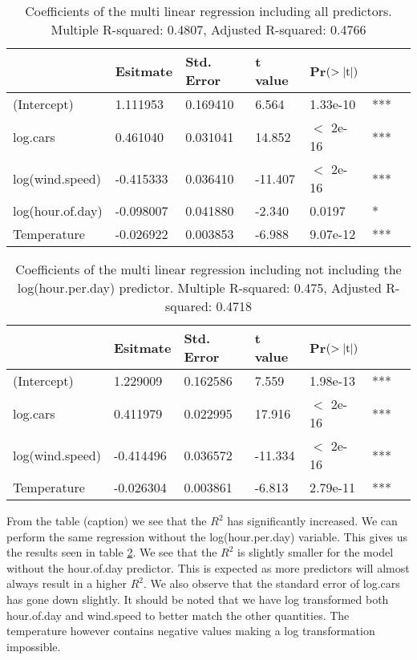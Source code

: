 \documentclass[a4paper, 10pt, reqno]{amsart}
\begin{document}
\begin{table}
\caption{Coefficients of the multi linear regression including all predictors. Multiple R-squared:  0.4807,	Adjusted R-squared:  0.4766 }
\label{tab: multilin all}
\begin{tabular}{lllllll}
\hline\hline
 & Esitmate  & Std. Error & t value & Pr$(>\abs{\mathrm{t}})$ & \\ \hline
(Intercept) & 1.111953 & 0.169410   & 6.564  & 1.33e-10 & ***\\
log.cars   & 0.461040 & 0.031041   & 14.852  & $<$ 2e-16 & ***\\
log(wind.speed) &  -0.415333 &  0.036410 & -11.407 & $<$ 2e-16 &***\\
log(hour.of.day) & -0.098007  & 0.041880 & -2.340 &  0.0197 &*\\
Temperature &            -0.026922  & 0.003853 & -6.988 &9.07e-12& ***\\
\hline
\end{tabular}
\end{table}

\begin{table}
\caption{Coefficients of the multi linear regression including not including the log(hour.per.day) predictor. Multiple R-squared:  0.475,	Adjusted R-squared:  0.4718  }
\label{tab: multilin}
\begin{tabular}{lllllll}
\hline\hline
 & Esitmate  & Std. Error & t value & Pr$(>\abs{\mathrm{t}})$ & \\ \hline
(Intercept)& 1.229009  & 0.162586  & 7.559 &1.98e-13 &***\\
log.cars   &0.411979&   0.022995  &17.916 & $<$ 2e-16& ***\\
log(wind.speed)& -0.414496  & 0.036572 &-11.334 & $<$ 2e-16 &***\\
Temperature &-0.026304  & 0.003861 & -6.813& 2.79e-11& ***\\
\hline
\end{tabular}
\end{table}

From the table (caption) we see that the $R^2$ has significantly increased. We can perform the same regression without the log(hour.per.day) variable. This gives us the results seen in table \ref{tab: multilin}. We see that the $R^2$ is slightly smaller for the model without the hour.of.day predictor. This is expected as more predictors will almost always result in a higher $R^2$. We also observe that the standard error of log.cars has gone down slightly. It should be noted that we have log transformed both hour.of.day and wind.speed to better match the other quantities. The temperature however contains negative values making a log transformation impossible.
\end{document}
